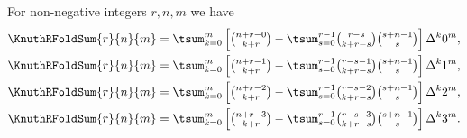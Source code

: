 \begin{example}
  For non-negative integers $r,n,m$ we have
  \begin{align*}
    \KnuthRFoldSum{r}{n}{m}
    &=
    \tsum_{k=0}^{m}
    \left[
      \tbinom{n+r-0}{k+r}
      -
      \tsum_{s=0}^{r-1}
      \tbinom{r-s}{k+r-s}
      \tbinom{s+n-1}{s}
    \right]
    \Delta^k 0^m,
    \\
    \KnuthRFoldSum{r}{n}{m}
    &=
    \tsum_{k=0}^{m}
    \left[
      \tbinom{n+r-1}{k+r}
      -
      \tsum_{s=0}^{r-1}
      \tbinom{r-s-1}{k+r-s}
      \tbinom{s+n-1}{s}
    \right]
    \Delta^k 1^m,
    \\
    \KnuthRFoldSum{r}{n}{m}
    &=
    \tsum_{k=0}^{m}
    \left[
      \tbinom{n+r-2}{k+r}
      -
      \tsum_{s=0}^{r-1}
      \tbinom{r-s-2}{k+r-s}
      \tbinom{s+n-1}{s}
    \right]
    \Delta^k 2^m,
    \\
    \KnuthRFoldSum{r}{n}{m}
    &=
    \tsum_{k=0}^{m}
    \left[
      \tbinom{n+r-3}{k+r}
      -
      \tsum_{s=0}^{r-1}
      \tbinom{r-s-3}{k+r-s}
      \tbinom{s+n-1}{s}
    \right]
    \Delta^k 3^m.
  \end{align*}
\end{example}
